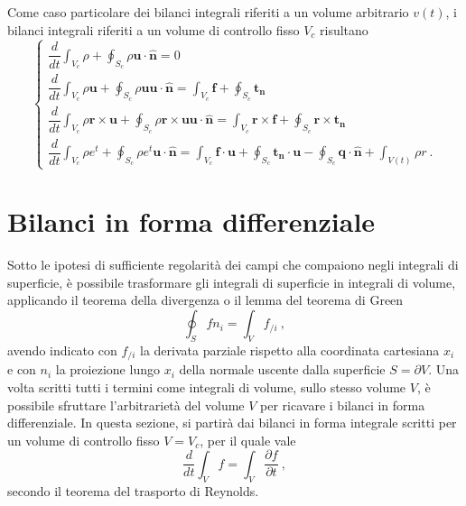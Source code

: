 Come caso particolare dei bilanci integrali riferiti a un volume arbitrario $v(t)$,  i bilanci integrali riferiti a un volume di controllo fisso $V_c$ risultano
\begin{equation}
 \begin{cases}
   \dfrac{d}{d t} \displaystyle\int_{V_c} \rho + \oint_{S_c} \rho \bm{u} \cdot \bm{\hat{n}} = 0 \\
   \dfrac{d}{d t} \displaystyle\int_{V_c} \rho  \bm{u}+ \oint_{S_c} \rho \bm{u} \bm{u} \cdot \bm{\hat{n}} = \int_{V_c} \bm{f} + \oint_{S_c} \bm{t_n} \\
   \dfrac{d}{d t} \displaystyle\int_{V_c} \rho \bm{r} \times \bm{u}+ \oint_{S_c} \rho \bm{r} \times \bm{u} \bm{u} \cdot \bm{\hat{n}} = \int_{V_c} \bm{r} \times \bm{f} + \oint_{S_c} \bm{r} \times \bm{t_n} \\
   \dfrac{d}{d t} \displaystyle\int_{V_c} \rho e^t + \oint_{S_c} \rho e^t \bm{u} \cdot \bm{\hat{n}} = \int_{V_c} \bm{f} \cdot \bm{u} + \oint_{S_c} \bm{t_n} \cdot \bm{u} - \oint_{S_c} \bm{q} \cdot \bm{\hat{n}} + \int_{V(t)} \rho r  \ .
 \end{cases}
\end{equation}


\section{Bilanci in forma differenziale}

Sotto le ipotesi di sufficiente regolarità dei campi che compaiono negli integrali di superficie, è possibile trasformare gli integrali di superficie in integrali di volume, applicando il teorema della divergenza o il lemma del teorema di Green
\begin{equation}
  \oint_{S} f n_i = \int_V f_{/i} \ ,
\end{equation}
 avendo indicato con $f_{/i}$ la derivata parziale rispetto alla coordinata cartesiana $x_i$ e con $n_i$ la proiezione lungo $x_i$ della normale uscente dalla superficie $S=\partial V$.
Una volta scritti tutti i termini come integrali di volume, sullo stesso volume $V$, è possibile sfruttare l'arbitrarietà del volume $V$ per ricavare i bilanci in forma differenziale.
In questa sezione, si partirà dai bilanci in forma integrale scritti per un volume di controllo fisso $V=V_c$, per il quale vale
\begin{equation}
 \dfrac{d}{d t} \int_V f = \int_V \dfrac{\partial f}{\partial t} \ ,
\end{equation}
secondo il teorema del trasporto di Reynolds.

